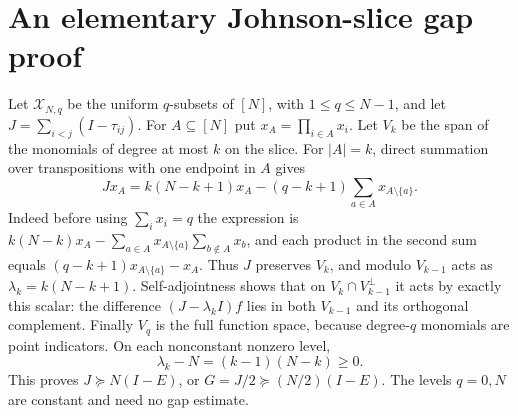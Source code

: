 \documentclass[11pt]{article}
\begin{document}
\section{An elementary Johnson-slice gap proof}
Let $\mathcal X_{N,q}$ be the uniform $q$-subsets of $[N]$, with
$1\le q\le N-1$, and let $J=\sum_{i<j}(I-\tau_{ij})$.
For $A\subseteq[N]$ put $x_A=\prod_{i\in A}x_i$. Let $V_k$ be the span
of the monomials of degree at most $k$ on the slice. For $|A|=k$, direct
summation over transpositions with one endpoint in $A$ gives
\[
 Jx_A=k(N-k+1)x_A-(q-k+1)\sum_{a\in A}x_{A\setminus\{a\}}.\tag{J}
\]
Indeed before using $\sum_i x_i=q$ the expression is
$k(N-k)x_A-\sum_{a\in A}x_{A\setminus\{a\}}\sum_{b\notin A}x_b$,
and each product in the second sum equals
$(q-k+1)x_{A\setminus\{a\}}-x_A$.
Thus $J$ preserves $V_k$, and modulo $V_{k-1}$ acts as
$\lambda_k=k(N-k+1)$. Self-adjointness shows that on
$V_k\cap V_{k-1}^{\perp}$ it acts by exactly this scalar: the difference
$(J-\lambda_k I)f$ lies in both $V_{k-1}$ and its orthogonal complement.
Finally $V_q$ is the full function space, because degree-$q$ monomials
are point indicators. On each nonconstant nonzero level,
\[
 \lambda_k-N=(k-1)(N-k)\ge0.
\]
This proves $J\succeq N(I-E)$, or $G=J/2\succeq(N/2)(I-E)$.
The levels $q=0,N$ are constant and need no gap estimate.
\end{document}
